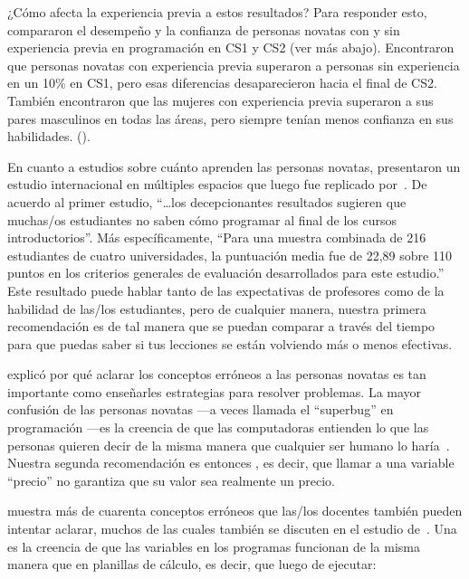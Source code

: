 ¿Cómo afecta la experiencia previa a estos resultados?
Para responder esto,
\cite{Wilc2018} compararon el desempeño y la confianza de personas novatas
con y sin experiencia previa en programación en CS1 y CS2 (ver más abajo).
Encontraron que personas novatas con experiencia previa superaron a personas sin experiencia en un 10\% en CS1,
pero esas diferencias desaparecieron hacia el final de CS2.
También encontraron que las mujeres con experiencia previa superaron a sus pares masculinos en todas las áreas,
pero siempre tenían menos confianza en sus habilidades. ().

En cuanto a estudios sobre cuánto aprenden las personas novatas,
\cite{McCr2001} presentaron un estudio internacional en múltiples espacios que luego fue replicado por~\cite{Utti2013}.
De acuerdo al primer estudio,
``{\ldots}los decepcionantes resultados sugieren que
muchas/os estudiantes no saben cómo programar al final de los cursos introductorios''.
Más específicamente,
``Para una muestra combinada de 216 estudiantes de cuatro universidades,
la puntuación media fue de 22,89 sobre 110 puntos en los criterios generales de evaluación desarrollados para este estudio.''
Este resultado puede hablar tanto de las expectativas de profesores como de la habilidad de las/los estudiantes,
pero de cualquier manera,
nuestra primera recomendación es 
de tal manera que se puedan comparar a través del tiempo para que puedas saber si tus lecciones se están volviendo más o menos efectivas.


 explicó por qué aclarar los conceptos erróneos a las personas novatas es tan importante como enseñarles
estrategias para resolver problemas.
La mayor confusión de las personas novatas ---a veces llamada el ``superbug'' en programación ---es
la creencia de que las computadoras entienden lo que las personas quieren decir de la misma manera que cualquier ser humano lo haría~\cite{Pea1986}.
Nuestra segunda recomendación es entonces ,
es decir, que llamar a una variable ``precio'' no garantiza que su valor sea realmente un precio.

\cite{Sorv2018} muestra más de cuarenta conceptos erróneos que las/los docentes también pueden intentar aclarar,
muchos de las cuales también se discuten en el estudio de~\cite{Qian2017}.
Una es la creencia de que las variables en los programas funcionan de la misma manera que en planillas de cálculo,
es decir, que luego de ejecutar:


